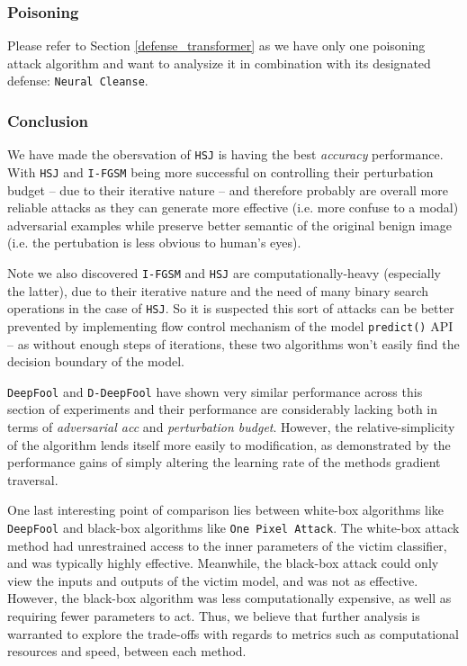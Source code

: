 \documentclass[11pt]{article}
\newcommand{\ilc}{\texttt}
\begin{document}
\subsubsection{Poisoning}
Please refer to Section \ref{defense_transformer} as we have only one poisoning attack algorithm and want to analysize it in combination with its designated defense: \ilc{Neural Cleanse}.

\subsubsection{Conclusion}

We have made the obersvation of \ilc{HSJ} is having the best \textit{accuracy} performance. With \ilc{HSJ} and \ilc{I-FGSM} being more successful on controlling their perturbation budget -- due to their iterative nature -- and therefore probably are overall more reliable attacks as they can generate more effective (i.e. more confuse to a modal) adversarial examples while preserve better semantic of the original benign image (i.e. the pertubation is less obvious to human's eyes).

Note we also discovered \ilc{I-FGSM} and \ilc{HSJ} are computationally-heavy (especially the latter), due to their iterative nature and the need of many binary search operations in the case of \ilc{HSJ}. So it is suspected this sort of attacks can be better prevented by implementing flow control mechanism of the model \ilc{predict()} API -- as without enough steps of iterations, these two algorithms won't easily find the decision boundary of the model.\newline


\ilc{DeepFool} and \ilc{D-DeepFool} have shown very similar performance across this section of experiments and their performance are considerably lacking both in terms of \textit{adversarial acc} and \textit{perturbation budget}. However, the relative-simplicity of the algorithm lends itself more easily to modification, as demonstrated by the performance gains of simply altering the learning rate of the methods gradient traversal.

One last interesting point of comparison lies between white-box algorithms like \ilc{DeepFool} and black-box algorithms like \ilc{One Pixel Attack}. The white-box attack method had unrestrained access to the inner parameters of the victim classifier, and was typically highly effective. Meanwhile, the black-box attack could only view the inputs and outputs of the victim model, and was not as effective. However, the black-box algorithm was less computationally expensive, as well as requiring fewer parameters to act. Thus, we believe that further analysis is warranted to explore the trade-offs with regards to metrics such as computational resources and speed, between each method.
\end{document}
